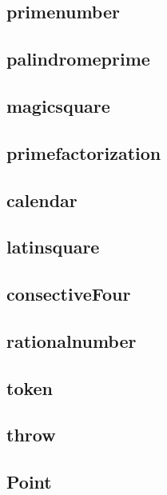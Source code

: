     \subsection{primenumber}
        
    \subsection{palindromeprime}
        
    \subsection{magicsquare}
        
    \subsection{primefactorization}
        
    \subsection{calendar}
        
    \subsection{latinsquare}
        
    \subsection{consectiveFour}
        
    \subsection{rationalnumber}
        
    \subsection{token}
        
    \subsection{throw}
        
    \subsection{Point}
        
        
        